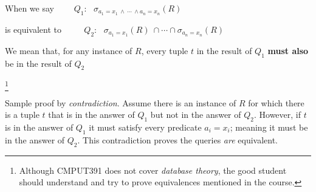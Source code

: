 \documentclass[xcolor={usenames,dvipsnames}]{beamer}
\begin{document}
%
%
\begin{frame}{}

When we say~~~~ 
\(Q_1: \ \ \ \sigma_{a_1=x_1 \ \wedge\ \cdots\ \wedge a_n=x_n}(R)\)

is equivalent to ~~~~
\(Q_2: \ \ \ \sigma_{a_1=x_1}(R) \ \cap \cdots \cap \sigma_{a_n=x_n}(R)\)

We mean that, for any instance of $R$, every tuple $t$ in the result of $Q_1$ \textbf{must also} be in the result of $Q_2$

\footnote{Although CMPUT391 does not cover \emph{database theory}, the good student should understand and try to prove equivalences mentioned in the course.}

Sample proof by \emph{contradiction}. Assume there is an instance of $R$ for which there is a tuple $t$ that is in the answer of $Q_1$ but not in the answer of $Q_2$. However, if $t$ is in the answer of $Q_1$ it must satisfy every predicate $a_i=x_i$; meaning it must be in the answer of $Q_2$. This contradiction proves the queries \emph{are} equivalent.

\end{frame}


%
%
\end{document}
